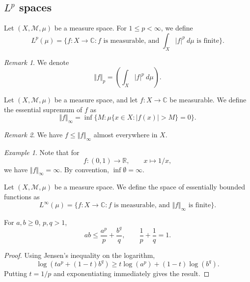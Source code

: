 \documentclass[11pt]{article}
\newcommand{\C}{\mathbb{C}}
\newcommand{\R}{\mathbb{R}}
\newcommand{\M}{\mathcal{M}}
\newcommand{\norm}[1]{\Vert #1 \Vert}
\theoremstyle{definition}
\theoremstyle{remark}
\newtheorem*{remark}{Remark}
\newtheorem*{example}{Example}
\numberwithin{equation}{section}
\begin{document}
    \subsection{$L^p$ spaces}
    \begin{definition}
        Let $(X, \M, \mu)$ be a measure space. For $1 \leq p < \infty$, we define \[
            L^p(\mu) = \{f\colon X \to \C : f\text{ is measurable, and }\int_X
            |f|^p\:d\mu \text{ is finite}\}.
        \]
        \begin{remark}
            We denote \[
                \norm{f}_p = \left(\int_X |f|^p\:d\mu\right).
            \] 
        \end{remark}
    \end{definition}

    \begin{definition}
        Let $(X, \M, \mu)$ be a measure space, and let $f\colon X \to \C$ be
        measurable. We define the essential supremum of $f$ as \[
            \norm{f}_\infty = \inf \{M : \mu\{x \in X: |f(x)| > M\} = 0\}.
        \]
        \begin{remark}
            We have $f \leq \norm{f}_\infty$ almost everywhere in $X$.
        \end{remark}
    \end{definition}
    \begin{example}
        Note that for \[
            f\colon (0, 1) \to \R, \qquad x \mapsto 1 / x,
        \] we have $\norm{f}_\infty = \infty$. By convention, $\inf\emptyset =
        \infty$.
    \end{example}

    \begin{definition}
        Let $(X, \M, \mu)$ be a measure space. We define the space of essentially
        bounded functions as \[
            L^\infty(\mu) = \{f\colon X \to \C : f\text{ is measurable, and }
            \norm{f}_\infty \text{ is finite}\}.
        \]
    \end{definition}

    \begin{lemma}[Young]
        For $a, b \geq 0$, $p, q > 1$, \[
            ab \leq \frac{a^p}{p} + \frac{b^q}{q}, \qquad \frac{1}{p} + \frac{1}{q} =
            1.
        \] 
    \end{lemma}
    \begin{proof}
        Using Jensen's inequality on the logarithm, \[
            \log(ta^p + (1 - t)b^q) \geq t\log(a^p) + (1 - t)\log(b^q).
        \] Putting $t = 1 / p$ and exponentiating immediately gives the result.
    \end{proof}
\end{document}
